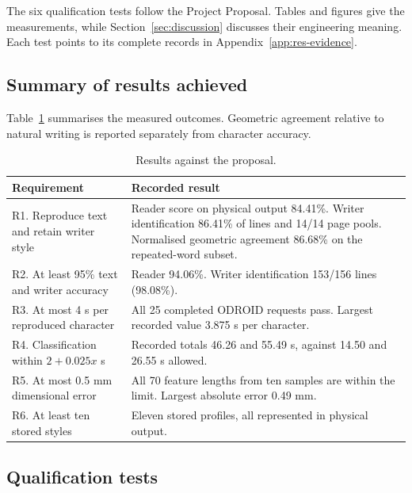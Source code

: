 \begingroup
\raggedbottom
\setlength{\textfloatsep}{12pt}
\setlength{\intextsep}{12pt}
\renewcommand{\resstep}[1]{\par\smallskip\noindent\QualificationSection{#1}\par\nobreak\smallskip}
\label{sec:results}
The six qualification tests follow the Project Proposal. Tables and figures give the measurements, while Section~\ref{sec:discussion} discusses their engineering meaning. Each test points to its complete records in Appendix~\ref{app:res-evidence}.

\subsection{Summary of results achieved}
\label{sec:res-summary}
Table~\ref{tab:res-summary} summarises the measured outcomes. Geometric agreement relative to natural writing is reported separately from character accuracy.
\begin{table}[!htbp]\centering\small
\begin{tabularx}{\linewidth}{p{.25\linewidth}X}\toprule
Requirement & Recorded result\\\midrule
R1. Reproduce text and retain writer style & Reader score on physical output 84.41\%. Writer identification 86.41\% of lines and 14/14 page pools. Normalised geometric agreement 86.68\% on the repeated-word subset.\\[3pt]
R2. At least 95\% text and writer accuracy & Reader 94.06\%. Writer identification 153/156 lines (98.08\%).\\[3pt]
R3. At most 4 s per reproduced character & All 25 completed ODROID requests pass. Largest recorded value 3.875 s per character.\\[3pt]
R4. Classification within $2+0.025x$ s & Recorded totals 46.26 and 55.49 s, against 14.50 and 26.55 s allowed.\\[3pt]
R5. At most 0.5 mm dimensional error & All 70 feature lengths from ten samples are within the limit. Largest absolute error 0.49 mm.\\[3pt]
R6. At least ten stored styles & Eleven stored profiles, all represented in physical output.\\\bottomrule
\end{tabularx}
\caption{Results against the proposal.}\label{tab:res-summary}
\end{table}
\FloatBarrier

\subsection{Qualification tests}
\label{sec:res-qtp}
